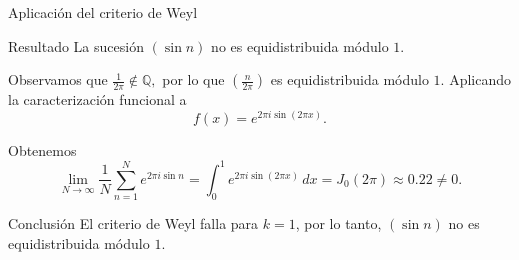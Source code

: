 \begin{frame}{Aplicación del criterio de Weyl}

\begin{block}{Resultado}
La sucesión $(\sin n)$ no es equidistribuida módulo $1$.
\end{block}

\vspace{0.1cm}
\pause

Observamos que $\frac{1}{2\pi}\notin\mathbb Q,$
por lo que $\left(\frac{n}{2\pi}\right)$ es equidistribuida módulo $1$.
Aplicando la caracterización funcional a
\[
f(x)=e^{2\pi i\sin(2\pi x)}.
\]

\pause

Obtenemos
\[
\lim_{N\to\infty} \frac1N \sum_{n=1}^{N} e^{2\pi i\sin n}
= \int_0^1 e^{2\pi i\sin(2\pi x)}\,dx = J_0(2\pi) \approx 0.22 \neq 0.
\]

\pause

\begin{alertblock}{Conclusión}
El criterio de Weyl falla para $k=1$, por lo tanto, $(\sin n)$ no es equidistribuida módulo $1$.
\end{alertblock}

\end{frame}